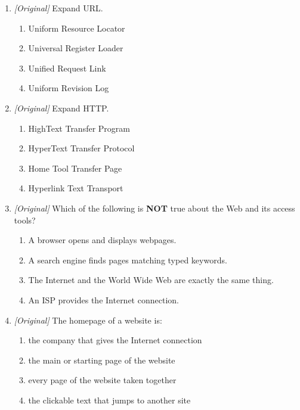 \documentclass[11pt]{article}
\begin{document}
\begin{enumerate}[label=\textbf{Q\arabic*.}, leftmargin=*]
\begin{enumerate}[label=\Alph*.]
    \item World Web Window
    \item Wide World Web
    \item World Wide Web
    \item Web World Wide
  \end{enumerate}
\item \textit{[Original]} Expand URL.
  \begin{enumerate}[label=\Alph*.]
    \item Uniform Resource Locator
    \item Universal Register Loader
    \item Unified Request Link
    \item Uniform Revision Log
  \end{enumerate}
\item \textit{[Original]} Expand HTTP.
  \begin{enumerate}[label=\Alph*.]
    \item HighText Transfer Program
    \item HyperText Transfer Protocol
    \item Home Tool Transfer Page
    \item Hyperlink Text Transport
  \end{enumerate}
\item \textit{[Original]} Which of the following is \textbf{NOT} true about
  the Web and its access tools?
  \begin{enumerate}[label=\Alph*.]
    \item A browser opens and displays webpages.
    \item A search engine finds pages matching typed keywords.
    \item The Internet and the World Wide Web are exactly the same thing.
    \item An ISP provides the Internet connection.
  \end{enumerate}
\item \textit{[Original]} The homepage of a website is:
  \begin{enumerate}[label=\Alph*.]
    \item the company that gives the Internet connection
    \item the main or starting page of the website
    \item every page of the website taken together
    \item the clickable text that jumps to another site
  \end{enumerate}

\end{enumerate}
\end{document}
